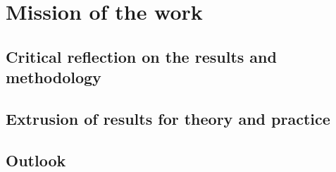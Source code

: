 \chapter{Mission of the work}
\section{Critical reflection on the results and methodology}
\section{Extrusion of results for theory and practice}
\section{Outlook}